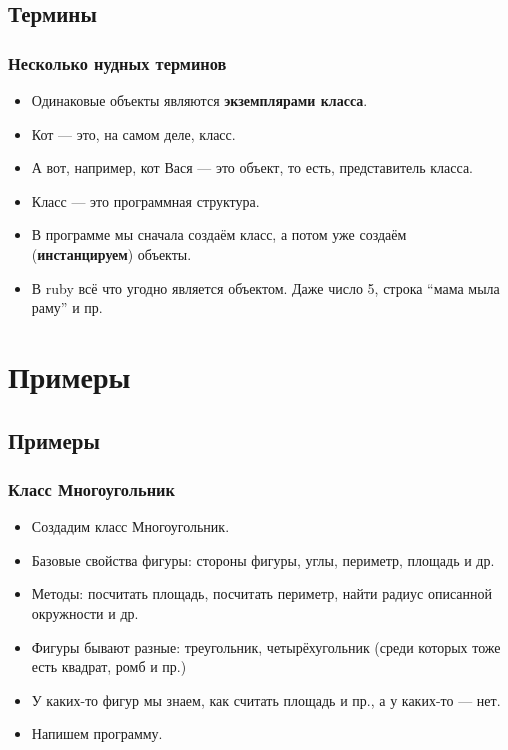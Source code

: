 \documentclass[compress,red]{beamer}
\begin{document}
\subsection{Термины}
\begin{frame}[fragile]
  \frametitle{Несколько нудных терминов}
  \begin{itemize}
    \item Одинаковые объекты являются \textbf{экземплярами класса}.
    \item Кот --- это, на самом деле, класс.
    \item А вот, например, кот Вася --- это объект, то есть, представитель класса.
    \item Класс --- это программная структура. 
    \item В программе мы сначала создаём класс, а потом уже создаём (\textbf{инстанцируем}) объекты.
    \item В ruby всё что угодно является объектом. Даже число 5, строка ``мама мыла раму'' и пр.
  \end{itemize}
\end{frame}

\section{Примеры}
\subsection{Примеры}
\begin{frame}[fragile]
  \frametitle{Класс Многоугольник}
  \begin{itemize}
    \item Создадим класс Многоугольник.
    \item Базовые свойства фигуры: стороны фигуры, углы, периметр, площадь и др.
    \item Методы: посчитать площадь, посчитать периметр, найти радиус описанной окружности и др.
    \item Фигуры бывают разные: треугольник, четырёхугольник (среди которых тоже есть квадрат, ромб и пр.)
    \item У каких-то фигур мы знаем, как считать площадь и пр., а у каких-то --- нет.
    \item Напишем программу.
  \end{itemize}
\end{frame}
\end{document}
